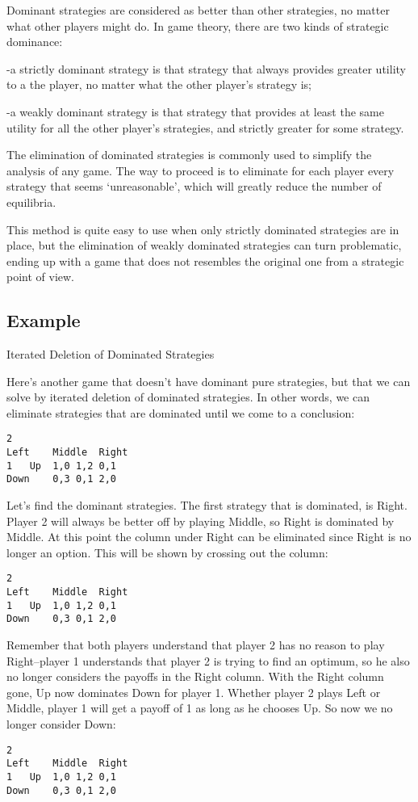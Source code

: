 \documentclass[11pt]{article} %
\begin{document}
Dominant strategies are considered as better than other 
strategies, no matter what other players might do. 
In game theory, there are two kinds of strategic dominance:

-a strictly dominant strategy is that strategy that always provides greater utility to a the player, no matter what the other player’s strategy is;

-a weakly dominant strategy is that strategy that provides at least the same utility for all the other player’s strategies, and strictly greater for some strategy.

 \newpage

The elimination of dominated strategies is commonly used to simplify the analysis of any game. The way to proceed is to eliminate for each player every strategy that seems ‘unreasonable’, which will greatly reduce the number of equilibria. 

This method is quite easy to use when only strictly dominated strategies are in place, but the elimination of weakly dominated strategies can turn problematic, ending up with a game that does not resembles the original one from a strategic point of view.

\subsection*{Example}

Iterated Deletion of Dominated Strategies

Here's another game that doesn't have dominant pure strategies, but that we can solve by iterated deletion of dominated strategies. In other words, we can eliminate strategies that are dominated until we come to a conclusion:
\begin{verbatim}
2
Left	Middle	Right
1	Up	1,0	1,2	0,1
Down	0,3	0,1	2,0
\end{verbatim}

Let's find the dominant strategies. The first strategy that is dominated, is Right. Player 2 will always be better off by playing Middle, so Right is dominated by Middle. At this point the column under Right can be eliminated since Right is no longer an option. This will be shown by crossing out the column:
\begin{verbatim}
2
Left	Middle	Right
1	Up	1,0	1,2	0,1
Down	0,3	0,1	2,0
\end{verbatim}

Remember that both players understand that player 2 has no reason to play Right--player 1 understands that player 2 is trying to find an optimum, so he also no longer considers the payoffs in the Right column. With the Right column gone, Up now dominates Down for player 1. Whether player 2 plays Left or Middle, player 1 will get a payoff of 1 as long as he chooses Up. So now we no longer consider Down:
\begin{verbatim}
2
Left	Middle	Right
1	Up	1,0	1,2	0,1
Down	0,3	0,1	2,0
\end{verbatim}
\end{document}
